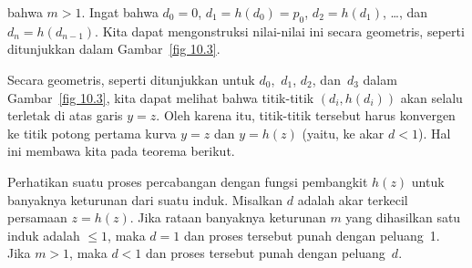\begin{example}
bahwa $m > 1$.  Ingat bahwa $d_0 = 0$, $d_1 = h(d_0) = p_0$, $d_2 = h(d_1)$,
\ldots, dan $d_n = h(d_{n - 1})$.  Kita dapat mengonstruksi nilai-nilai ini secara geometris,
seperti ditunjukkan dalam Gambar~\ref{fig 10.3}.
\par
Secara geometris, seperti ditunjukkan untuk $d_0$,~$d_1$, $d_2$, dan~$d_3$ dalam
Gambar~\ref{fig 10.3}, kita dapat melihat bahwa titik-titik $(d_i,h(d_i))$ akan selalu terletak di atas garis $y =
z$.  Oleh karena itu, titik-titik tersebut harus konvergen ke titik potong pertama kurva $y = z$
dan $y = h(z)$ (yaitu, ke akar $d < 1$).  Hal ini membawa kita pada
teorema berikut.
\end{example}
\begin{theorem}\label{thm 10.3}
Perhatikan suatu proses percabangan dengan fungsi pembangkit $h(z)$ untuk banyaknya
keturunan dari suatu induk.  Misalkan $d$ adalah akar terkecil persamaan $z =
h(z)$.  Jika rataan banyaknya keturunan $m$ yang dihasilkan satu induk adalah
${} \leq 1$, maka $d = 1$ dan proses tersebut punah dengan peluang~1.  Jika $m > 1$,
maka $d < 1$ dan proses tersebut punah dengan peluang~$d$.
\end{theorem}

